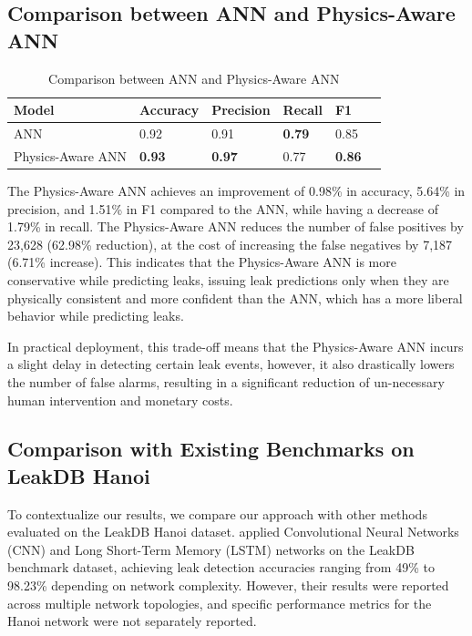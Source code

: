 \documentclass[final,5p,times,twocolumn,authoryear]{elsarticle}
\begin{document}
\subsection{Comparison between ANN and Physics-Aware ANN}

\begin{table}[H]
\centering
\caption{Comparison between ANN and Physics-Aware ANN}
\label{tab:ann_paann_comparison}
\begin{tabular}{@{}llllll@{}}
\toprule
\textbf{Model}             & \textbf{Accuracy} & \textbf{Precision} & \textbf{Recall} & \textbf{F1}     \\ \midrule
ANN               & 0.92   & 0.91    & \textbf{0.79} & 0.85 \\
Physics-Aware ANN & \textbf{0.93}   & \textbf{0.97}    & 0.77 & \textbf{0.86}  \\ \bottomrule
\end{tabular}
\end{table}

The Physics-Aware ANN achieves an improvement of 0.98\% in accuracy, 5.64\% in precision, and 1.51\% in F1 compared to the ANN, while having a decrease of 1.79\% in recall. The Physics-Aware ANN reduces the number of false positives by 23,628 (62.98\% reduction), at the cost of increasing the false negatives by 7,187 (6.71\% increase). This indicates that the Physics-Aware ANN is more conservative while predicting leaks, issuing leak predictions only when they are physically consistent and more confident than the ANN, which has a more liberal behavior while predicting leaks.

In practical deployment, this trade-off means that the Physics-Aware ANN incurs a slight delay in detecting certain leak events, however, it also drastically lowers the number of false alarms, resulting in a significant reduction of un-necessary human intervention and monetary costs.

\subsection{Comparison with Existing Benchmarks on LeakDB Hanoi}

To contextualize our results, we compare our approach with other methods evaluated on the LeakDB Hanoi dataset. \cite{punukollu2023leakdetection} applied Convolutional Neural Networks (CNN) and Long Short-Term Memory (LSTM) networks on the LeakDB benchmark dataset, achieving leak detection accuracies ranging from 49\% to 98.23\% depending on network complexity. However, their results were reported across multiple network topologies, and specific performance metrics for the Hanoi network were not separately reported.
\end{document}
